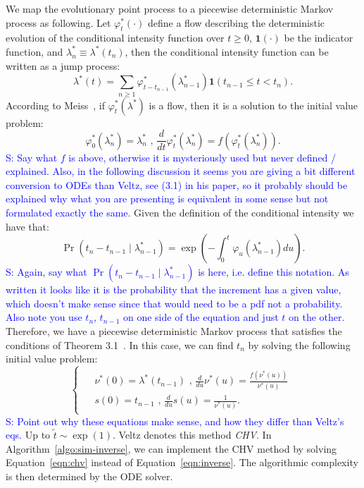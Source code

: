 \documentclass{juliacon}
\newcommand{\comment}[1]{\textcolor{blue}{#1}}
\begin{document}
We map the evolutionary point process to a piecewise deterministic Markov process as following. Let \( \varphi_t^\ast( \cdot ) \) define a flow describing the deterministic evolution of the conditional intensity function over \( t \geq 0 \), \( \mathbf{1}( \cdot ) \) be the indicator function, and \( \lambda^\ast_n \equiv \lambda^\ast(t_n) \),  then the conditional intensity function can be written as a jump process:
\[
  \lambda^\ast (t) = \sum_{n \geq 1} \varphi^\ast_{t - t_{n-1}} ( \lambda_{n-1}^\ast ) \mathbf{1}(t_{n-1} \leq t < t_n).
\]
According to Meiss~\cite{meiss2017}, if \( \varphi^\ast_t (\lambda^\ast) \) is a flow, then it is a solution to the initial value problem:
\[
  \varphi^\ast_0 (\lambda_n^\ast) = \lambda_n^\ast \text{ , }
  \frac{d}{dt} \varphi^\ast_t (\lambda_n^\ast) = f(\varphi^\ast_t (\lambda_n^\ast)).
\]
\comment{S: Say what $f$ is above, otherwise it is mysteriously used but never defined / explained. Also, in the following discussion it seems you are giving a bit different conversion to ODEs than Veltz, see (3.1) in his paper, so it probably should be explained why what you are presenting is equivalent in some sense but not formulated exactly the same.} Given the definition of the conditional intensity we have that:
\[
\Pr(t_n - t_{n-1} \mid \lambda_{n-1}^\ast) = \exp \left( -\int_0^t \varphi_u (\lambda_{n-1}^\ast) du \right).
\]
\comment{S: Again, say what $\Pr(t_n - t_{n-1} \mid \lambda^*_{n-1})$ is here, i.e. define this notation. As written it looks like it is the probability that the increment has a given value, which doesn't make sense since that would need to be a pdf not a probability. Also note you use $t_n$, $t_{n-1}$ on one side of the equation and just $t$ on the other.}
Therefore, we have a piecewise deterministic Markov process that satisfies the conditions of Theorem 3.1~\cite{veltz2015}. In this case, we can find \( t_n \) by solving the following initial value problem:
\begin{equation} \label{eqn:chv}
  \begin{cases}
  \begin{aligned}
    & \nu^\ast (0) = \lambda^\ast (t_{n-1}) \text{ , } \frac{d}{d u} \nu^\ast (u) = \frac{f(\nu^\ast (u))}{\nu^\ast (u)} \\
    & s (0) = t_{n-1} \text{ , } \frac{d}{d u} s (u) = \frac{1}{\nu^\ast (u)}.
  \end{aligned}
  \end{cases}
\end{equation}
\comment{S: Point out why these equations make sense, and how they differ than Veltz's eqs.}
Up to \( \tilde{t} \sim \exp(1) \). Veltz denotes this method \textit{CHV}. In Algorithm~\ref{algo:sim-inverse}, we can implement the CHV method by solving Equation~\ref{eqn:chv} instead of Equation~\ref{eqn:inverse}. The algorithmic complexity is then determined by the ODE solver.
\end{document}
